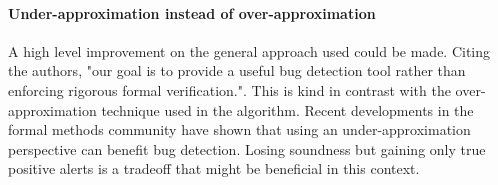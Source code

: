 \documentclass{article}
\begin{document}
\paragraph*{Under-approximation instead of over-approximation}
A high level improvement  on the general approach used could be made. Citing the authors, "our goal is to provide a useful bug detection tool rather
than enforcing rigorous formal verification.". This is kind in contrast with the over-approximation technique used in the algorithm. Recent developments 
in the formal methods community \cite{o2019incorrectness}\cite{murray2021incremental}\cite{le2022finding} have shown that using an under-approximation perspective can benefit bug detection. Losing soundness but gaining only true positive  alerts 
is a tradeoff that might be beneficial in this context.


\end{document}

